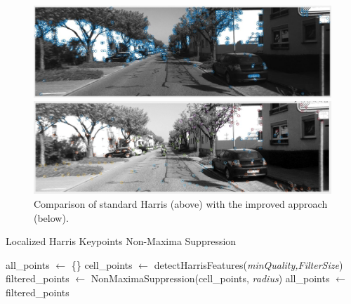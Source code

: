 \documentclass{article}
\begin{document}
\begin{figure}
\begin{center}
\includegraphics[width=0.7\linewidth]{Pictures/HarrisBad}

\includegraphics[width=0.7\linewidth]{Pictures/LocalizedHarrisGood}
\end{center}
\caption{Comparison of standard Harris (above) with the improved approach (below).}
\label{fig:HarrisVsHarris}
\end{figure}


\begin{algorithm}
\caption{Localized Harris Keypoints Non-Maxima Suppression}
\begin{algorithmic}[1]
\State all\_points $\gets$ \{\}
\State cell\_points $\gets$ detectHarrisFeatures(\emph{minQuality,FilterSize})
\State filtered\_points $\gets$ NonMaximaSuppression(cell\_points, \emph{radius})
\EndWhile
\State all\_points $\gets$ filtered\_points
\EndFor
\EndFunction
\end{algorithmic}
\label{alg:LocHarr}
\end{algorithm}
\end{document}
